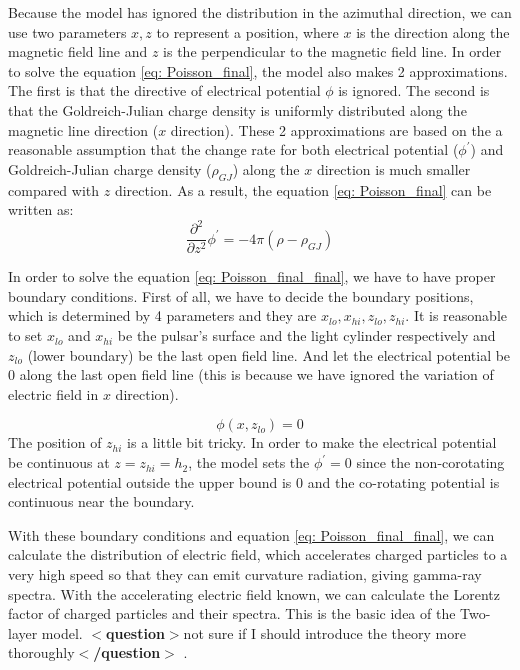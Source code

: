\documentclass[12pt]{report}
\newcommand{\gj}[0]{
  Goldreich-Julian charge density
}
\newcommand{\question}[1]{
  $<$\textbf{question}$>$#1$<$\textbf{/question}$>$
}
\begin{document}
      Because the model has ignored the distribution in the azimuthal direction, we can use two parameters 
      $x, z$ to represent a position, where $x$ is the direction along the magnetic field line and $z$ is the 
      perpendicular to the magnetic field line. In order to solve the equation \ref{eq: Poisson_final}, 
      the model also makes 2 approximations. The first is that the directive of electrical potential $\phi$ 
      is ignored. The second is that the \gj{} is uniformly distributed along the magnetic line direction 
      ($x$ direction). These 2 approximations are based on the a reasonable assumption that the change rate 
      for both electrical potential ($\phi^{\prime}$) and \gj{}($\rho_{GJ}$) along the $x$ direction is much 
      smaller compared with $z$ direction. 
      As a result, the equation \ref{eq: Poisson_final} can be written as: 
      \begin{equation}
        \label{eq: Poisson_final_final}
        \frac{\partial^2}{\partial z^2} \phi^{\prime} = -4\pi\left(\rho - \rho_{GJ} \right)
      \end{equation}

      In order to solve the equation \ref{eq: Poisson_final_final}, we have to have proper boundary conditions. 
      First of all, we have to decide the boundary positions, which is determined by 4 parameters and they are  
      $x_{lo}, x_{hi}, z_{lo}, z_{hi}$. It is reasonable to set $x_{lo}$ and $x_{hi}$
      be the pulsar's surface and the light cylinder respectively and $z_{lo}$ (lower boundary) be the last open 
      field line. And let the electrical potential be $0$ along the last open field line (this is because we have 
      ignored the variation of electric field in $x$ direction).   

      \begin{equation}
        \label{eq: lower_boundary}
        \phi \left(x, z_{lo}\right) = 0
      \end{equation}
      The position of $z_{hi}$ is a little bit tricky. In order to make the electrical potential be 
      continuous at $z = z_{hi} = h_2$, the model sets the $\phi^{\prime} = 0$ since the 
      non-corotating electrical potential outside the upper bound is $0$ and the co-rotating potential
      is continuous near the boundary. 

      With these boundary conditions and equation \ref{eq: Poisson_final_final}, we can calculate the 
      distribution of electric field, which accelerates charged particles to a very high speed so that 
      they can emit curvature radiation, giving gamma-ray spectra. With the accelerating electric field 
      known, we can calculate the Lorentz factor of charged particles and their spectra. This is the 
      basic idea of the Two-layer model. \question{not sure if I should introduce the theory more 
      thoroughly}.
\end{document}
